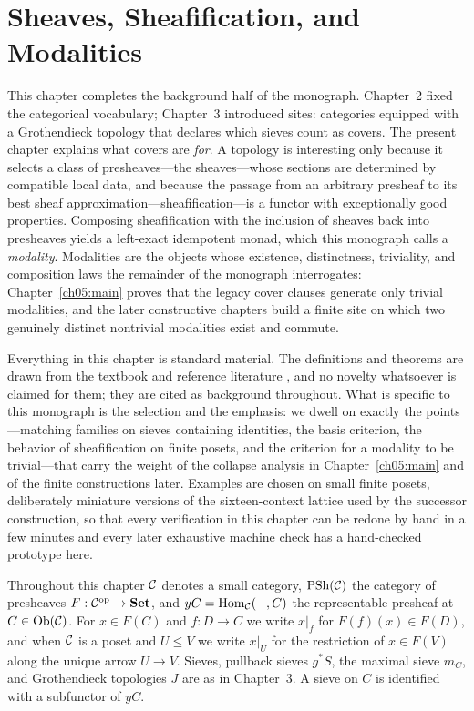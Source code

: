 \chapter{Sheaves, Sheafification, and Modalities}\label{ch04:main}

This chapter completes the background half of the monograph. Chapter~2 fixed the
categorical vocabulary; Chapter~3 introduced sites: categories equipped with a
Grothendieck topology that declares which sieves count as covers. The present
chapter explains what covers are \emph{for}. A topology is interesting only
because it selects a class of presheaves---the sheaves---whose sections are
determined by compatible local data, and because the passage from an arbitrary
presheaf to its best sheaf approximation---sheafification---is a functor with
exceptionally good properties. Composing sheafification with the inclusion of
sheaves back into presheaves yields a left-exact idempotent monad, which this
monograph calls a \emph{modality}. Modalities are the objects whose existence,
distinctness, triviality, and composition laws the remainder of the monograph
interrogates: Chapter~\ref{ch05:main} proves that the legacy cover clauses
generate only trivial modalities, and the later constructive chapters build a
finite site on which two genuinely distinct nontrivial modalities exist and
commute.

Everything in this chapter is standard material. The definitions and theorems
are drawn from the textbook and reference literature
\cite{maclane,johnstone,stacks00W1,stacks00ZC}, and no novelty whatsoever is
claimed for them; they are cited as background throughout. What is specific to
this monograph is the selection and the emphasis: we dwell on exactly the
points---matching families on sieves containing identities, the basis
criterion, the behavior of sheafification on finite posets, and the criterion
for a modality to be trivial---that carry the weight of the collapse analysis
in Chapter~\ref{ch05:main} and of the finite constructions later. Examples are
chosen on small finite posets, deliberately miniature versions of the
sixteen-context lattice used by the successor construction, so that every
verification in this chapter can be redone by hand in a few minutes and every
later exhaustive machine check has a hand-checked prototype here.

\begin{notation}\label{ch04:not:conventions}
Throughout this chapter $\mathcal{C}$ denotes a small category, $\mathrm{PSh}(\mathcal{C})$ the
category of presheaves $F:\mathcal{C}^{\mathrm{op}}\to\mathbf{Set}$, and $yC=\mathrm{Hom}_{\mathcal{C}}(-,C)$
the representable presheaf at $C\in\mathrm{Ob}(\mathcal{C})$. For $x\in F(C)$ and
$f:D\to C$ we write $x|_f$ for $F(f)(x)\in F(D)$, and when $\mathcal{C}$ is a poset and
$U\le V$ we write $x|_U$ for the restriction of $x\in F(V)$ along the unique
arrow $U\to V$. Sieves, pullback sieves $g^{*}S$, the maximal sieve $m_C$, and
Grothendieck topologies $J$ are as in Chapter~3. A sieve on $C$ is identified
with a subfunctor of $yC$.
\end{notation}

